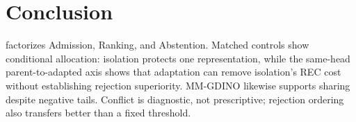 \section{Conclusion}
\label{sec:conclusion}

\method factorizes Admission, Ranking, and Abstention.  Matched controls show
conditional allocation: isolation protects one representation, while the
same-head parent-to-adapted axis shows that adaptation can remove isolation's REC
cost without establishing rejection superiority.  MM-GDINO likewise supports
sharing despite negative tails.  Conflict is diagnostic, not prescriptive;
rejection ordering also transfers better than a fixed threshold.
